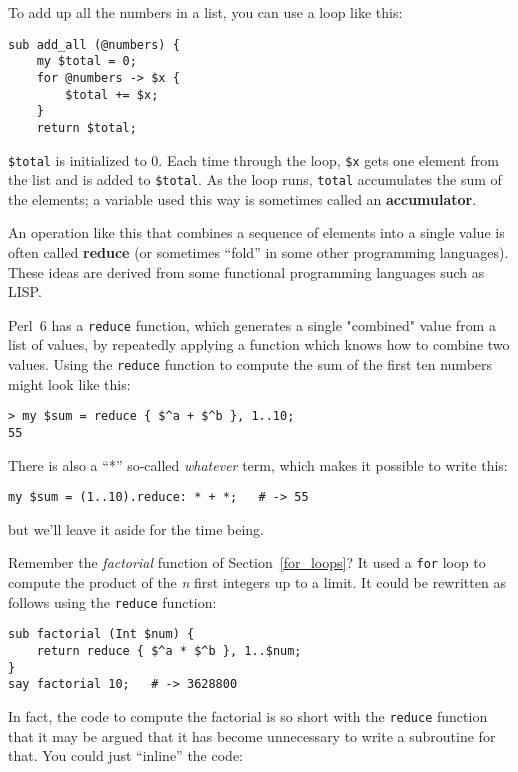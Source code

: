 To add up all the numbers in a list, you can use a loop like this:


\begin{verbatim}
sub add_all (@numbers) {
    my $total = 0;
    for @numbers -> $x {
        $total += $x;
    }
    return $total;
\end{verbatim}
%
{\tt \$total} is initialized to 0.  Each time through the loop,
{\tt \$x} gets one element from the list and is added to 
{\tt \$total}. As the loop runs, {\tt total} accumulates the 
sum of the elements; a variable used this way is sometimes 
called an {\bf accumulator}.

An operation like this that combines a sequence of elements into
a single value is often called {\bf reduce} (or sometimes 
``fold'' in some other programming languages). These ideas 
are derived from some functional programming languages such 
as LISP.

Perl~6 has a {\tt reduce} function, which generates a single 
"combined" value from a list of values, by repeatedly 
applying a function which knows how to combine two values. 
Using the {\tt reduce} function to compute the sum of the 
first ten numbers might look like this:

\begin{verbatim}
> my $sum = reduce { $^a + $^b }, 1..10;
55
\end{verbatim}

There is also a ``*'' so-called \emph{whatever} term, 
which makes it possible to write this:

\begin{verbatim}
my $sum = (1..10).reduce: * + *;   # -> 55
\end{verbatim}

but we'll leave it aside for the time being.

Remember the \emph{factorial} function of Section~\ref{for_loops}? 
It used a {\tt for} loop to compute the product of the \emph{n} first 
integers up to a limit. It could be rewritten as follows using the 
{\tt reduce} function:

\begin{verbatim}
sub factorial (Int $num) { 
    return reduce { $^a * $^b }, 1..$num;
}
say factorial 10;   # -> 3628800
\end{verbatim}
%
In fact, the code to compute the factorial is so short with 
the {\tt reduce} function that it may be argued that it has 
become unnecessary to write a subroutine for that. You could 
just ``inline'' the code:

